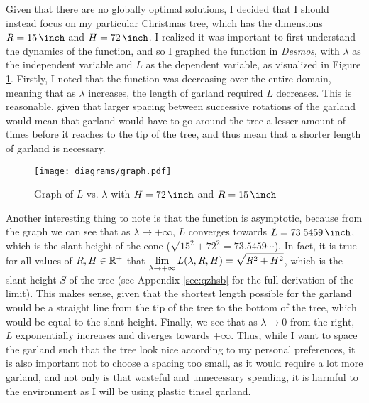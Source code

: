 Given that there are no globally optimal solutions, I decided that I should instead focus on my particular Christmas tree, which has the dimensions $R=\US{15}{\inch}$ and $H=\US{72}{\inch}$. I realized it was important to first understand the dynamics of the function, and so I graphed the function in \emph{Desmos}, with $\lambda$ as the independent variable and $L$ as the dependent variable, as visualized in Figure \ref{fig:graph}. Firstly, I noted that the function was decreasing over the entire domain, meaning that as $\lambda$ increases, the length of garland required $L$ decreases. This is reasonable, given that larger spacing between successive rotations of the garland would mean that garland would have to go around the tree a lesser amount of times before it reaches to the tip of the tree, and thus mean that a shorter length of garland is necessary.
\begin{figure}[H]
    \vspace*{5pt}
    \centering
    \texttt{[image: diagrams/graph.pdf]}
    \caption{Graph of $L$ vs. $\lambda$ with $H=\US{72}{\inch}$ and $R=\US{15}{\inch}$} \label{fig:graph}
    \vspace*{-15pt}
\end{figure}
\noindent Another interesting thing to note is that the function is asymptotic, because from the graph we can see that as $\lambda \rightarrow +\infty$, $L$ converges towards $L = \US{73.5459}{\inch}$, which is the slant height of the cone ($\sqrt{15^2+72^2} = 73.5459\cdots$). In fact, it is true for all values of $R, H \in \mathbb{R}^+$ that $\displaystyle\lim_{\lambda \to +\infty} L(\lambda, R, H) = \sqrt{R^2+H^2}$, which is the slant height $S$ of the tree (see Appendix \ref{sec:qzhsb} for the full derivation of the limit). This makes sense, given that the shortest length possible for the garland would be a straight line from the tip of the tree to the bottom of the tree, which would be equal to the slant height. Finally, we see that as $\lambda \to 0$ from the right, $L$ exponentially increases and diverges towards $+\infty$. Thus, while I want to space the garland such that the tree look nice according to my personal preferences, it is also important not to choose a spacing too small, as it would require a lot more garland, and not only is that wasteful and unnecessary spending, it is harmful to the environment as I will be using plastic tinsel garland.

